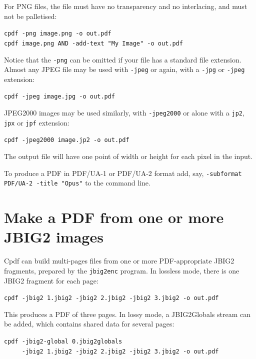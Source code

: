 \documentclass{book}
\begin{document}
For PNG files, the file must have no transparency and no interlacing, and must not be palletised:

\begin{framed}
 \noindent\small\verb?cpdf -png image.png -o out.pdf?\\
 \noindent\small\verb?cpdf image.png AND -add-text "My Image" -o out.pdf?
\end{framed}

\noindent Notice that the \texttt{-png} can be omitted if your file has a standard file extension. Almost any JPEG file may be used with \texttt{-jpeg} or again, with a \texttt{-jpg} or \texttt{-jpeg} extension:

\begin{framed}
 \noindent\small\verb?cpdf -jpeg image.jpg -o out.pdf?
\end{framed}

\noindent JPEG2000 images may be used similarly, with \texttt{-jpeg2000} or alone with a \texttt{jp2}, \texttt{jpx} or \texttt{jpf} extension:

\begin{framed}
 \noindent\small\verb?cpdf -jpeg2000 image.jp2 -o out.pdf?
\end{framed}

\noindent The output file will have one point of width or height for each pixel in the input.

To produce a PDF in PDF/UA-1 or PDF/UA-2 format add, say, \texttt{-subformat PDF/UA-2 -title "Opus"} to the command line.

\section{Make a PDF from one or more JBIG2 images}

Cpdf can build multi-pages files from one or more PDF-appropriate JBIG2 fragments, prepared by the \texttt{jbig2enc} program. In lossless mode, there is one JBIG2 fragment for each page:

\begin{framed}
 \noindent\small\verb?cpdf -jbig2 1.jbig2 -jbig2 2.jbig2 -jbig2 3.jbig2 -o out.pdf?
\end{framed}

\noindent This produces a PDF of three pages. In lossy mode, a JBIG2Globals stream can be added, which contains shared data for several pages:

\begin{framed}
 \noindent\small\verb?cpdf -jbig2-global 0.jbig2globals?\\
 \noindent\small\verb!     -jbig2 1.jbig2 -jbig2 2.jbig2 -jbig2 3.jbig2 -o out.pdf!
\end{framed}
\end{document}
